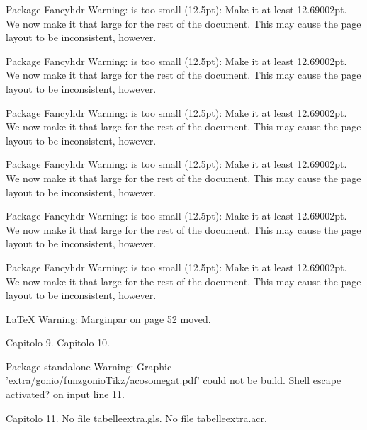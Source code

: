 Package Fancyhdr Warning: \headheight is too small (12.5pt): 
 Make it at least 12.69002pt.
 We now make it that large for the rest of the document.
 This may cause the page layout to be inconsistent, however.


Package Fancyhdr Warning: \headheight is too small (12.5pt): 
 Make it at least 12.69002pt.
 We now make it that large for the rest of the document.
 This may cause the page layout to be inconsistent, however.


Package Fancyhdr Warning: \headheight is too small (12.5pt): 
 Make it at least 12.69002pt.
 We now make it that large for the rest of the document.
 This may cause the page layout to be inconsistent, however.


Package Fancyhdr Warning: \headheight is too small (12.5pt): 
 Make it at least 12.69002pt.
 We now make it that large for the rest of the document.
 This may cause the page layout to be inconsistent, however.


Package Fancyhdr Warning: \headheight is too small (12.5pt): 
 Make it at least 12.69002pt.
 We now make it that large for the rest of the document.
 This may cause the page layout to be inconsistent, however.


Package Fancyhdr Warning: \headheight is too small (12.5pt): 
 Make it at least 12.69002pt.
 We now make it that large for the rest of the document.
 This may cause the page layout to be inconsistent, however.


LaTeX Warning: Marginpar on page 52 moved.

Capitolo 9.
Capitolo 10.

Package standalone Warning: Graphic 'extra/gonio/funzgonioTikz/acosomegat.pdf' could not be build.
Shell escape activated? on input line 11.

Capitolo 11.
No file tabelleextra.gls.
No file tabelleextra.acr.

